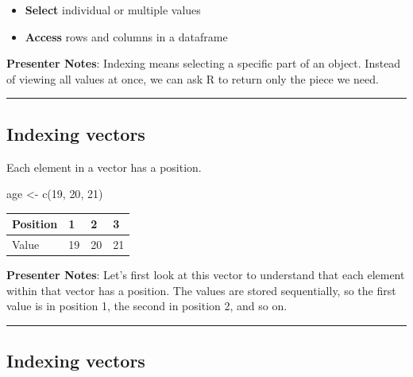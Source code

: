 \documentclass[
  letterpaper,
  DIV=11,
  numbers=noendperiod]{scrartcl}
\newenvironment{Shaded}{\begin{snugshade}}{\end{snugshade}}
\newcommand{\DecValTok}[1]{\textcolor[rgb]{0.68,0.00,0.00}{#1}}
\newcommand{\FunctionTok}[1]{\textcolor[rgb]{0.28,0.35,0.67}{#1}}
\newcommand{\NormalTok}[1]{\textcolor[rgb]{0.00,0.23,0.31}{#1}}
\newcommand{\OtherTok}[1]{\textcolor[rgb]{0.00,0.23,0.31}{#1}}
\newcounter{none} %
\providecommand{\tightlist}{%
  \setlength{\itemsep}{0pt}\setlength{\parskip}{0pt}}
\begin{document}
\begin{itemize}
\tightlist
\item
  \textbf{Select} individual or multiple values
\item
  \textbf{Access} rows and columns in a dataframe
\end{itemize}

\textbf{Presenter Notes}: Indexing means selecting a specific part of an
object. Instead of viewing all values at once, we can ask R to return
only the piece we need.

\begin{center}\rule{0.5\linewidth}{0.5pt}\end{center}

\subsection{Indexing vectors}\label{indexing-vectors}

Each element in a vector has a position.

\begin{Shaded}
\begin{Highlighting}[]
\NormalTok{age }\OtherTok{\textless{}{-}} \FunctionTok{c}\NormalTok{(}\DecValTok{19}\NormalTok{, }\DecValTok{20}\NormalTok{, }\DecValTok{21}\NormalTok{)}
\end{Highlighting}
\end{Shaded}

{\def\LTcaptype{none} %
\begin{longtable}[]{@{}llll@{}}
\toprule\noalign{}
Position & 1 & 2 & 3 \\
\midrule\noalign{}
\endhead
\bottomrule\noalign{}
\endlastfoot
Value & 19 & 20 & 21 \\
\end{longtable}
}

\textbf{Presenter Notes}: Let's first look at this vector to understand
that each element within that vector has a position. The values are
stored sequentially, so the first value is in position 1, the second in
position 2, and so on.

\begin{center}\rule{0.5\linewidth}{0.5pt}\end{center}

\subsection{Indexing vectors}\label{indexing-vectors-1}
\end{document}
